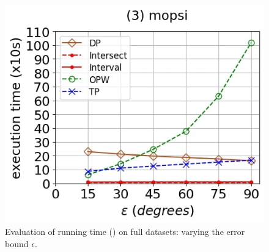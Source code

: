 {\begin{figure}[tb!]
	\includegraphics[scale=0.250]{Figures/Exp-DAD-time-epsilon-mopsi.jpg}		
	\vspace{-2ex}
	\caption{\small Evaluation of running time (\dad) on full datasets: varying the error bound $\epsilon$.}\label{fig:time-epsilon-dad}
	\vspace{-2ex}
\end{figure}


}
